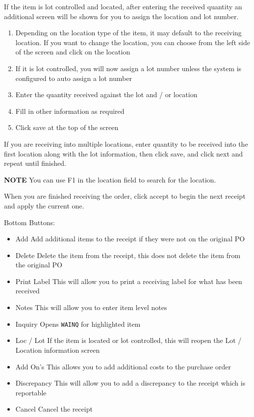 If the item is lot controlled and located, after entering the received quantity an additional screen will be shown for you to assign the location and lot number.

\begin{enumerate}
	\item Depending on the location type of the item, it may default to the receiving location. If you want to change the location, you can choose from the left side of the screen and click on the location
	\item If it is lot controlled, you will now assign a lot number unless the system is configured to auto assign a lot number
	\item Enter the quantity received against the lot and / or location
	\item Fill in other information as required
	\item Click save at the top of the screen
\end{enumerate}

If you are receiving into multiple locations, enter quantity to be received into the first location along with the lot information, then click save, and click next and repeat until finished.

\textbf{NOTE} You can use F1 in the location field to search for the location.

When you are finished receiving the order, click accept to begin the next receipt and apply the current one.

Bottom Buttons:

\begin{itemize}
	\item Add \textemdash Add additional items to the receipt if they were not on the original PO
	\item Delete \textemdash Delete the item from the receipt, this does not delete the item from the original PO
	\item Print Label \textemdash This will allow you to print a receiving label for what has been received
	\item Notes \textemdash This will allow you to enter item level notes
	\item Inquiry \textemdash Opens \texttt{WAINQ} for highlighted item
	\item Loc / Lot \textemdash If the item is located or lot controlled, this will reopen the Lot / Location information screen
	\item Add On's \textemdash This allows you to add additional costs to the purchase order
	\item Discrepancy \textemdash This will allow you to add a discrepancy to the receipt which is reportable
	\item Cancel \textemdash Cancel the receipt
\end{itemize}

